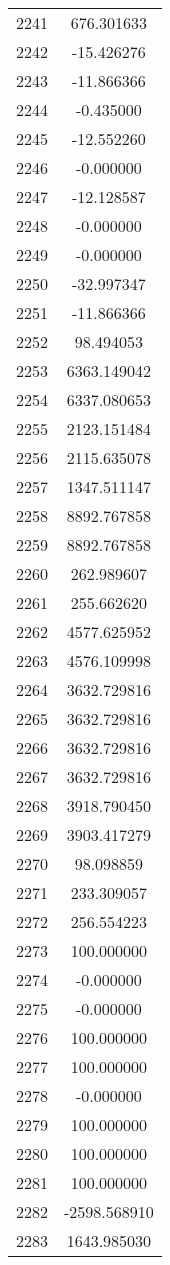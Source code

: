 \documentclass[12pt]{article}
\begin{document}
\begin{longtable}{@{}cc@{}}
2241 & 676.301633 \\
2242 & -15.426276 \\
2243 & -11.866366 \\
2244 & -0.435000 \\
2245 & -12.552260 \\
2246 & -0.000000 \\
2247 & -12.128587 \\
2248 & -0.000000 \\
2249 & -0.000000 \\
2250 & -32.997347 \\
2251 & -11.866366 \\
2252 & 98.494053 \\
2253 & 6363.149042 \\
2254 & 6337.080653 \\
2255 & 2123.151484 \\
2256 & 2115.635078 \\
2257 & 1347.511147 \\
2258 & 8892.767858 \\
2259 & 8892.767858 \\
2260 & 262.989607 \\
2261 & 255.662620 \\
2262 & 4577.625952 \\
2263 & 4576.109998 \\
2264 & 3632.729816 \\
2265 & 3632.729816 \\
2266 & 3632.729816 \\
2267 & 3632.729816 \\
2268 & 3918.790450 \\
2269 & 3903.417279 \\
2270 & 98.098859 \\
2271 & 233.309057 \\
2272 & 256.554223 \\
2273 & 100.000000 \\
2274 & -0.000000 \\
2275 & -0.000000 \\
2276 & 100.000000 \\
2277 & 100.000000 \\
2278 & -0.000000 \\
2279 & 100.000000 \\
2280 & 100.000000 \\
2281 & 100.000000 \\
2282 & -2598.568910 \\
2283 & 1643.985030 \\

\end{longtable}
\end{document}
